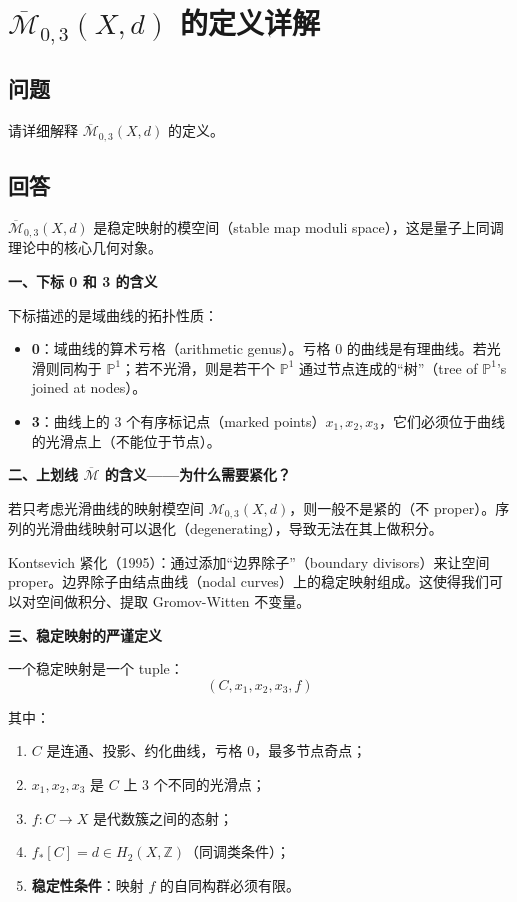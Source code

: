 \section{ $\overline{\mathcal{M}}_{0,3}(X, d)$ 的定义详解}\label{sec:qa-moduli-space-definition}
\subsection{问题}
请详细解释 $\overline{\mathcal{M}}_{0,3}(X, d)$ 的定义。
\subsection{回答}
$\overline{\mathcal{M}}_{0,3}(X, d)$ 是稳定映射的模空间（stable map moduli space），这是量子上同调理论中的核心几何对象。

\textbf{一、下标 0 和 3 的含义}

下标描述的是域曲线的拓扑性质：
\begin{itemize}
\item \textbf{0}：域曲线的算术亏格（arithmetic genus）。亏格 0 的曲线是有理曲线。若光滑则同构于 $\mathbb{P}^1$；若不光滑，则是若干个 $\mathbb{P}^1$ 通过节点连成的``树''（tree of $\mathbb{P}^1$'s joined at nodes）。
\item \textbf{3}：曲线上的 3 个有序标记点（marked points）$x_1, x_2, x_3$，它们必须位于曲线的光滑点上（不能位于节点）。
\end{itemize}

\textbf{二、上划线 $\overline{\mathcal{M}}$ 的含义——为什么需要紧化？}

若只考虑光滑曲线的映射模空间 $\mathcal{M}_{0,3}(X, d)$，则一般不是紧的（不 proper）。序列的光滑曲线映射可以退化（degenerating），导致无法在其上做积分。

Kontsevich 紧化（1995）：通过添加``边界除子''（boundary divisors）来让空间 proper。边界除子由结点曲线（nodal curves）上的稳定映射组成。这使得我们可以对空间做积分、提取 Gromov-Witten 不变量。

\textbf{三、稳定映射的严谨定义}

一个稳定映射是一个 tuple：
$$\left(C, x_1, x_2, x_3, f\right)$$

其中：
\begin{enumerate}
\item $C$ 是连通、投影、约化曲线，亏格 0，最多节点奇点；
\item $x_1, x_2, x_3$ 是 $C$ 上 3 个不同的光滑点；
\item $f: C \rightarrow X$ 是代数簇之间的态射；
\item $f_*[C]=d \in H_2(X, \mathbb{Z})$（同调类条件）；
\item \textbf{稳定性条件}：映射 $f$ 的自同构群必须有限。
\end{enumerate}

